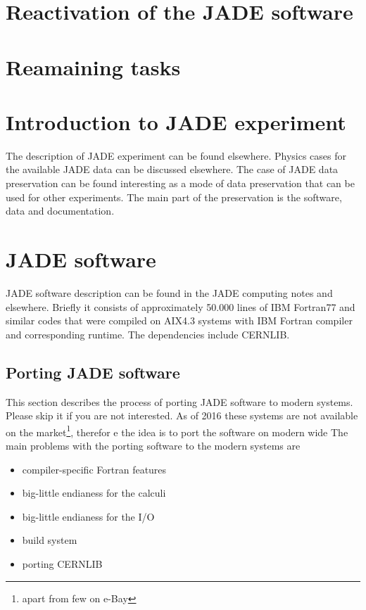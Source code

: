 \section{Reactivation of the JADE software}




\section{Reamaining tasks}

\section{Introduction to JADE experiment}
The description of JADE experiment can be found elsewhere.\cite{Bartel:1986ua}
Physics cases for the available JADE data can be discussed elsewhere\cite{Bartel:1986ua}.
The case of JADE data preservation can be found interesting as a mode of data preservation that can be used for other experiments.
The main part of the preservation is the  software, data and documentation.
\section{JADE software}
JADE software description can be found in the JADE computing notes and elsewhere.
Briefly it consists of approximately 50.000 lines of IBM Fortran77 and similar codes 
that were compiled on AIX4.3 systems with IBM Fortran compiler and corresponding runtime.
The dependencies include CERNLIB.


\subsection{Porting JADE software}
This section describes the process of porting JADE software to modern systems.
Please skip it if you are not interested.
As of 2016 these systems are not available on the market\footnote{apart from few on e-Bay},
therefor e the idea is to port the software on modern wide 
The main problems with the porting software to the modern systems are
\begin{itemize}
\item  compiler-specific Fortran features
\item  big-little endianess for the calculi
\item  big-little endianess for the I/O
\item  build system 
\item  porting CERNLIB
\end{itemize}

